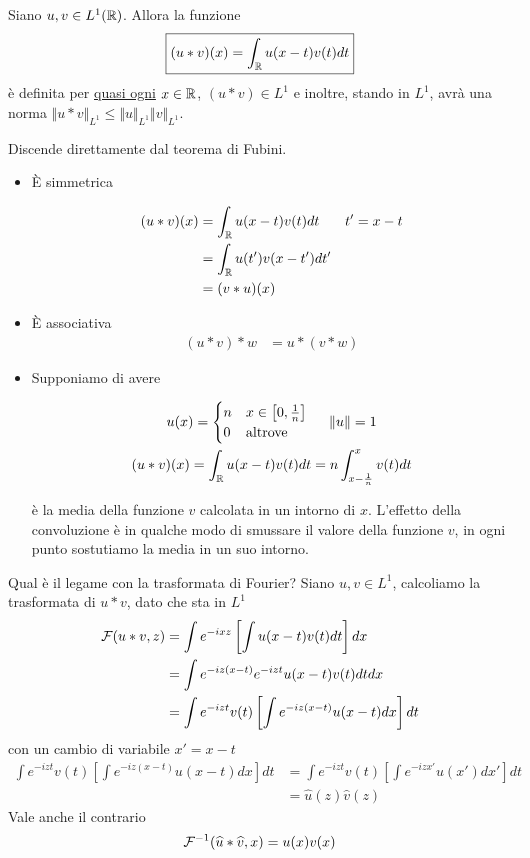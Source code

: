 \begin{thm}
Siano $u, v\in L^{1}(\mathbb{R})$. Allora la funzione
\begin{equation*}
\boxed{(u*v)(x) = \int_{\mathbb{R}} u(x - t) v(t) dt}
\end{equation*}
è definita per \underline{quasi ogni} $x\in \mathbb{R}$, $(u*v) \in L^{1}$ e inoltre, stando in $L^{1}$, avrà una norma $ \Vert u*v \Vert_{L^{1}} \leq \Vert u \Vert_{L^{1}} \Vert v \Vert_{L^{1}}$.
\end{thm}
Discende direttamente dal teorema di Fubini.
\begin{itemize}
\item È simmetrica

\begin{equation*}
\begin{aligned}
(u*v)(x) & = \int_{\mathbb{R}} u(x - t) v(t) dt & t' = x - t\\
 & = \int_{\mathbb{R}} u(t') v(x - t') dt' & \\
 & = (v*u)(x) &
\end{aligned}
\end{equation*}
\item È associativa
\begin{align*}
(u*v) *w & = u*(v*w)
\end{align*}
\item Supponiamo di avere

\begin{gather*}
u(x) =
\begin{cases}
n & x\in \left[0, \frac{1}{n}\right]\\
0 & \text{altrove}
\end{cases} \ \ \ \ \Vert u \Vert = 1\\
(u*v)(x) = \int_{\mathbb{R}} u(x - t) v(t) dt = n\int^{x}_{x - \frac{1}{n}} v(t) dt
\end{gather*}

è la media della funzione $v$ calcolata in un intorno di $x$. L'effetto della convoluzione è in qualche modo di smussare il valore della funzione $v$, in ogni punto sostutiamo la media in un suo intorno.
\end{itemize}

Qual è il legame con la trasformata di Fourier? Siano $u, v\in L^{1}$, calcoliamo la trasformata di $u*v$, dato che sta in $L^{1}$
\begin{align*}
\mathcal{F}(u*v, z) & = \int e^{- ixz}\left[\int u(x - t) v(t) dt\right] dx\\
 & = \int e^{- iz(x - t)} e^{- izt} u(x - t) v(t) dtdx\\
 & = \int e^{- izt} v(t)\left[\int e^{- iz(x - t)} u(x - t) dx\right] dt
\end{align*}
con un cambio di variabile $x' = x - t$
\begin{align*}
\int e^{- izt} v(t)\left[\int e^{- iz(x - t)} u(x - t) dx\right] dt & = \int e^{- izt} v(t)\left[\int e^{- izx'} u(x') dx'\right] dt\\
 & = \hat{u}(z)\hat{v}(z)
\end{align*}
Vale anche il contrario
\begin{equation*}
\mathcal{F}^{- 1}(\widehat{u} *\widehat{v}, x) = u(x) v(x)
\end{equation*}

